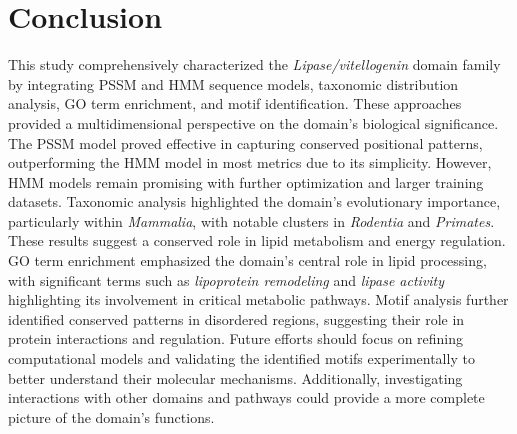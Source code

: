
\section{Conclusion}
This study comprehensively characterized the \textit{Lipase/vitellogenin} domain family by integrating PSSM and HMM sequence models, taxonomic distribution analysis, GO term enrichment, and motif identification. These approaches provided a multidimensional perspective on the domain’s biological significance.
The PSSM model proved effective in capturing conserved positional patterns, outperforming the HMM model in most metrics due to its simplicity. However, HMM models remain promising with further optimization and larger training datasets. Taxonomic analysis highlighted the domain's evolutionary importance, particularly within \textit{Mammalia}, with notable clusters in \textit{Rodentia} and \textit{Primates}. These results suggest a conserved role in lipid metabolism and energy regulation.
GO term enrichment emphasized the domain's central role in lipid processing, with significant terms such as \textit{lipoprotein remodeling} and \textit{lipase activity} highlighting its involvement in critical metabolic pathways. Motif analysis further identified conserved patterns in disordered regions, suggesting their role in protein interactions and regulation.
Future efforts should focus on refining computational models and validating the identified motifs experimentally to better understand their molecular mechanisms. Additionally, investigating interactions with other domains and pathways could provide a more complete picture of the domain’s functions.
